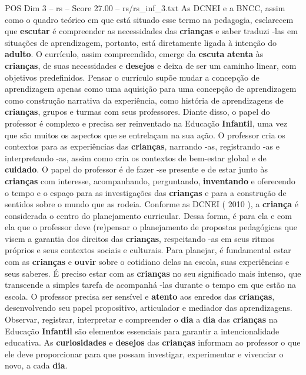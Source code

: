 \begin{textsample}{POS Dim 3 – rs – Score 27.00 – rs/rs\_inf\_3.txt}
As DCNEI e a BNCC, assim como o quadro teórico em que está situado esse termo na pedagogia, esclarecem que \textbf{escutar} é compreender as necessidades das \textbf{crianças} e saber traduzi -las em situações de aprendizagem, portanto, está diretamente ligada à intenção do \textbf{adulto}.
O currículo, assim compreendido, emerge da \textbf{escuta} \textbf{atenta} às \textbf{crianças}, de suas necessidades e \textbf{desejos} e deixa de ser um caminho linear, com objetivos predefinidos.
Pensar o currículo supõe mudar a concepção de aprendizagem apenas como uma aquisição para uma concepção de aprendizagem como construção narrativa da experiência, como história de aprendizagens de \textbf{crianças}, grupos e turmas com seus professores.
Diante disso, o papel do professor é complexo e precisa ser reinventado na Educação \textbf{Infantil}, uma vez que são muitos os aspectos que se entrelaçam na sua ação.
O professor cria os contextos para as experiências das \textbf{crianças}, narrando -as, registrando -as e interpretando -as, assim como cria os contextos de bem-estar global e de \textbf{cuidado}.
O papel do professor é de fazer -se presente e de estar junto às \textbf{crianças} com interesse, acompanhando, perguntando, \textbf{inventando} e oferecendo o tempo e o espaço para as investigações das \textbf{crianças} e para a construção de sentidos sobre o mundo que as rodeia.
Conforme as DCNEI ( 2010 ), a \textbf{criança} é considerada o centro do planejamento curricular.
Dessa forma, é para ela e com ela que o professor deve (re)pensar o planejamento de propostas pedagógicas que visem a garantia dos direitos das \textbf{crianças}, respeitando -as em seus ritmos próprios e seus contextos sociais e culturais.
Para planejar, é fundamental estar com as \textbf{crianças} e \textbf{ouvir} sobre o cotidiano delas na escola, suas experiências e seus saberes.
É preciso estar com as \textbf{crianças} no seu significado mais intenso, que transcende a simples tarefa de acompanhá -las durante o tempo em que estão na escola.
O professor precisa ser sensível e \textbf{atento} aos enredos das \textbf{crianças}, desenvolvendo seu papel propositivo, articulador e mediador das aprendizagens.
Observar, registrar, interpretar e compreender o \textbf{dia} a \textbf{dia} das \textbf{crianças} na Educação \textbf{Infantil} são elementos essenciais para garantir a intencionalidade educativa.
As \textbf{curiosidades} e \textbf{desejos} das \textbf{crianças} informam ao professor o que ele deve proporcionar para que possam investigar, experimentar e vivenciar o novo, a cada \textbf{dia}.

\end{textsample}
